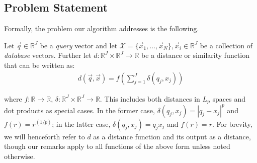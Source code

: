 





\subsection{Problem Statement}

Formally, the problem our algorithm addresses is the following.

Let $\vec{q} \in \mathbb{R}^J$ be a \textit{query} vector and let $\mathcal{X} = \{\vec{x}_1,\ldots,\vec{x}_N\}, \vec{x}_i \in \mathbb{R}^J$ be a collection of \textit{database} vectors. Further let $d: \mathbb{R}^J \times \mathbb{R}^J \rightarrow \mathbb{R}$ be a distance or similarity function that can be written as:
\begin{align} \label{eq:distFuncForm}
        d(\vec{q}, \vec{x}) = f(\sum_{j=1}^J \delta(q_j, x_j))
\end{align}


where $f: \mathbb{R} \rightarrow \mathbb{R}$, $\delta: \mathbb{R}^J \times \mathbb{R}^J \rightarrow \mathbb{R}$. This includes both distances in $L_p$ spaces and dot products as special cases. In the former case, $\delta(q_j, x_j) = |q_j - x_j|^p$ and $f(r) = r^{(1/p)}$; in the latter case, $\delta(q_j, x_j) = q_j x_j$ and $f(r) = r$. For brevity, we will henceforth refer to $d$ as a distance function and its output as a distance, though our remarks apply to all functions of the above form unless noted otherwise.

